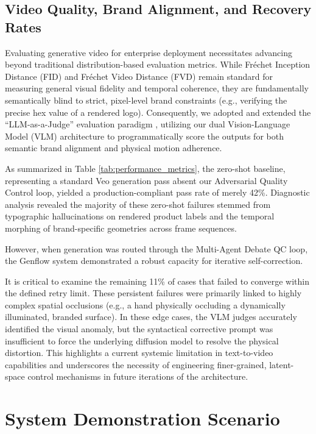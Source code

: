 \documentclass[sigconf,authordraft]{acmart}
\begin{document}
\subsection{Video Quality, Brand Alignment, and Recovery Rates}

Evaluating generative video for enterprise deployment necessitates advancing beyond traditional distribution-based evaluation metrics. While Fréchet Inception Distance (FID) \cite{heusel2017gans} and Fréchet Video Distance (FVD) \cite{unterthiner2018towards} remain standard for measuring general visual fidelity and temporal coherence, they are fundamentally semantically blind to strict, pixel-level brand constraints (e.g., verifying the precise hex value of a rendered logo). Consequently, we adopted and extended the ``LLM-as-a-Judge'' evaluation paradigm \cite{zheng2023judging}, utilizing our dual Vision-Language Model (VLM) architecture to programmatically score the outputs for both semantic brand alignment and physical motion adherence.

As summarized in Table \ref{tab:performance_metrics}, the zero-shot baseline, representing a standard Veo generation pass absent our Adversarial Quality Control loop, yielded a production-compliant pass rate of merely 42\%. Diagnostic analysis revealed the majority of these zero-shot failures stemmed from typographic hallucinations on rendered product labels and the temporal morphing of brand-specific geometries across frame sequences.

However, when generation was routed through the Multi-Agent Debate QC loop, the Genflow system demonstrated a robust capacity for iterative self-correction.

It is critical to examine the remaining 11\% of cases that failed to converge within the defined retry limit. These persistent failures were primarily linked to highly complex spatial occlusions (e.g., a hand physically occluding a dynamically illuminated, branded surface). In these edge cases, the VLM judges accurately identified the visual anomaly, but the syntactical corrective prompt was insufficient to force the underlying diffusion model to resolve the physical distortion. This highlights a current systemic limitation in text-to-video capabilities and underscores the necessity of engineering finer-grained, latent-space control mechanisms in future iterations of the architecture.

\section{System Demonstration Scenario}
\end{document}
